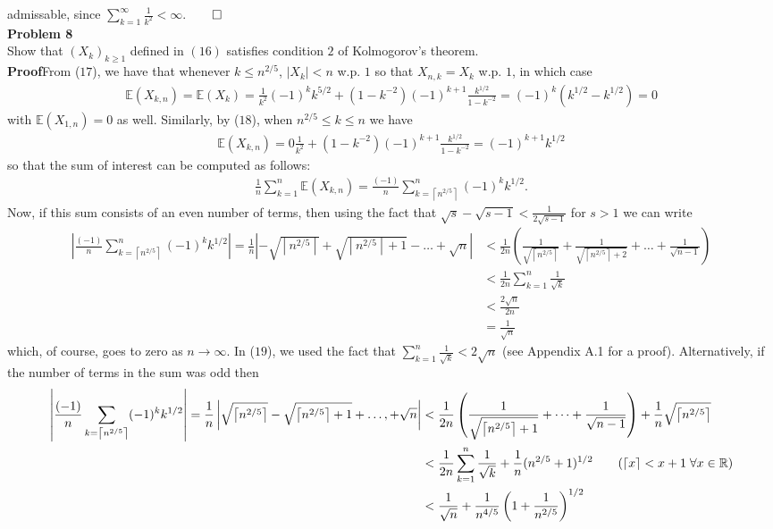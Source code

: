 \documentclass[10pt]{article}
\newcommand{\E}{\mathbb{E}}
\newcommand{\bp}[1]{\left({#1}\right)}
\newcommand{\mbb}[1]{\mathbb{#1}}
\newcommand{\1}[1]{\mathbbm{1}_{#1}}
\newcommand*{\ceil}[1]{\left\lceil#1\right\rceil}
\begin{document}
    admissable, since $\sum_{k=1}^\infty\tfrac{1}{k^2}<\infty$.\hfill{$\qed$}\\[5pt]
    {\bf Problem 8}\\[5pt]
    Show that $(X_k)_{k\geq 1}$ defined in $(16)$ satisfies condition $2$ of Kolmogorov's theorem.\\[5pt]
    {\bf Proof}\hspace{5pt}From ($17$), we have that whenever $k\leq n^{2/5}$, $|X_k|<n$ w.p. $1$ so that $X_{n,k}=X_k$ w.p. $1$, in which case
    \begin{align*}
        \E(X_{k,n})=\E(X_k)=\frac{1}{k^2}(-1)^kk^{5/2}+(1-k^{-2})(-1)^{k+1}\frac{k^{1/2}}{1-k^{-2}}=(-1)^k(k^{1/2}-k^{1/2})=0
    \end{align*}
    with $\E(X_{1,n})=0$ as well. Similarly, by ($18$), when $n^{2/5}\leq k\leq n$ we have
    \begin{align*}
        \E(X_{k,n})=0\frac{1}{k^2}+(1-k^{-2})(-1)^{k+1}\frac{k^{1/2}}{1-k^{-2}}=(-1)^{k+1}k^{1/2}
    \end{align*}
    so that the sum of interest can be computed as follows:
    \begin{align*}
        \frac{1}{n}\sum_{k=1}^n\E(X_{k,n})=\frac{(-1)}{n}\sum_{k=\ceil{n^{2/5}}}^n(-1)^kk^{1/2}.
    \end{align*}
    Now, if this sum consists of an even number of terms, then using the fact that $\sqrt{s}-\sqrt{s-1}<\tfrac{1}{2\sqrt{s-1}}$ for $s>1$ we can write
    \begin{align*}
        \left|\frac{(-1)}{n}\sum_{k=\ceil{n^{2/5}}}^n(-1)^kk^{1/2}\right|=\frac{1}{n}\left|-\sqrt{\ceil{n^{2/5}}}+\sqrt{\ceil{n^{2/5}}+1}-\dots+\sqrt{n}\right|&<\frac{1}{2n}\bp{\frac{1}{\sqrt{\ceil{n^{2/5}}}}+\frac{1}{\sqrt{\ceil{n^{2/5}}+2}}+\dots+\frac{1}{\sqrt{n-1}}}\\
        &<\frac{1}{2n}\sum_{k=1}^{n}\frac{1}{\sqrt{k}}\\
        &<\frac{2\sqrt{n}}{2n}\tag{19}\\
        &=\frac{1}{\sqrt{n}}
    \end{align*}
    which, of course, goes to zero as $n\rightarrow\infty$. In ($19$), we used the fact that $\sum_{k=1}^n\tfrac{1}{\sqrt{k}}<2\sqrt{n}$ (see Appendix A.1 for a proof). Alternatively, if the number of terms in the sum was odd then
    \begin{align*}
        \left|\frac{(-1)}{n}\sum_{k=\ceil{n^{2/5}}}(-1)^kk^{1/2}\right|=\frac{1}{n}\left|\sqrt{\ceil{n^{2/5}}}-\sqrt{\ceil{n^{2/5}}+1}+\dots,+\sqrt{n}\right|&<\frac{1}{2n}\bp{\frac{1}{\sqrt{\ceil{n^{2/5}}+1}}+\dots+\frac{1}{\sqrt{n-1}}}+\frac{1}{n}\sqrt{\ceil{n^{2/5}}}\\
        &<\frac{1}{2n}\sum_{k=1}^n\frac{1}{\sqrt{k}}+\frac{1}{n}(n^{2/5}+1)^{1/2}\tag{$\ceil{x}<x+1\;\forall x\in\mbb{R}$}\\
        &<\frac{1}{\sqrt{n}}+\frac{1}{n^{4/5}}\bp{1+\frac{1}{n^{2/5}}}^{1/2}
    \end{align*}
\end{document}
